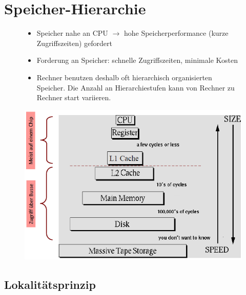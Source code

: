 \section{Speicher-Hierarchie}

\begin{figure}[htbp]

	\begin{minipage}{0.5\textwidth}		
		\begin{itemize}[noitemsep,topsep=0pt]
			\item Speicher nahe an CPU $\rightarrow$ hohe Speicherperformance (kurze Zugriffszeiten) gefordert
			\item Forderung an Speicher: schnelle Zugriffszeiten, minimale Kosten
			\item Rechner benutzen deshalb oft hierarchisch organisierten Speicher. Die Anzahl an Hierarchiestufen kann von Rechner zu Rechner start variieren.
		\end{itemize}	
	\end{minipage}
	\hfill		
	\begin{minipage}{0.45\textwidth} 
		\includegraphics[width=\textwidth]{images/Speicherhierarchie/UebersichtSpeicherhierarchie.PNG}
	\end{minipage}
	
\end{figure}

\subsection{Lokalitätsprinzip}

